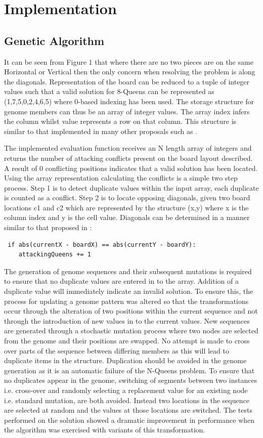\documentclass[conference]{IEEEtran}
\begin{document}
\section{Implementation}
\subsection{Genetic Algorithm}
It can be seen from Figure 1 that where there are no two pieces are on the same Horizontal or Vertical then the only concern when resolving the problem is along the diagonals. Representation of the board can be reduced to a tuple of integer values such that a valid solution for 8-Queens can be represented as (1,7,5,0,2,4,6,5) where 0-based indexing has been used. The storage structure for genome members can thus be an array of integer values. The array index infers the column whilst value represents a row on that column. This structure is similar to that implemented in many other proposals such as \cite{Performance} \cite{Polynomial}.

The implemented evaluation function receives an N length array of integers and returns the number of attacking conflicts present on the board layout described. A result of 0 conflicting positions indicates that a valid solution has been located. Using the array representation calculating the conflicts is a simple two step process. Step 1 is to detect duplicate values within the input array, each duplicate is counted as a conflict. Step 2 is to locate opposing diagonals, given two board locations c1 and c2 which are represented by the structure (x,y) where x is the column index and y is the cell value. Diagonals can be determined in a manner similar to that proposed in \cite{Adaptive}: 
\begin{lstlisting}
 if abs(currentX - boardX) == abs(currentY - boardY):
	attackingQueens += 1
\end{lstlisting}

The generation of genome sequences and their subsequent mutations is required to ensure that no duplicate values are entered in to the array. Addition of a duplicate value will immediately indicate an invalid solution. To ensure this, the process for updating a genome pattern was altered so that the transformations occur through the alteration of two positions within the current sequence and not through the introduction of new values in to the current values. New sequences are generated through a stochastic mutation process where two nodes are selected from the genome and their positions are swapped. No attempt is made to cross over parts of the sequence between differing members as this will lead to duplicate items in the structure. Duplication should be avoided in the genome generation as it is an automatic failure of the N-Queens problem. To ensure that no duplicates appear in the genome, switching of segments between two instances i.e. cross-over and randomly selecting a replacement value for an existing node i.e. standard mutation, are both avoided. Instead two locations in the sequence are selected at random and the values at those locations are switched. The tests performed on the solution showed a dramatic improvement in performance when the algorithm was exercised with variants of this transformation.
\end{document}
